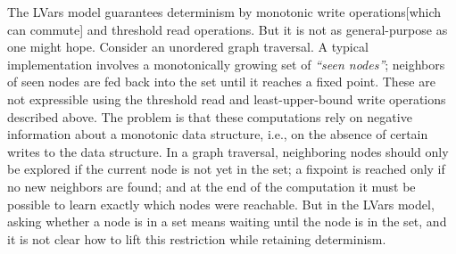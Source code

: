 \documentclass[twocolumn]{article}
\begin{document}
The LVars model guarantees determinism by monotonic write operations[which can commute] and threshold read operations. But it is not as general-purpose as one might hope. Consider an unordered graph traversal. A typical implementation involves a monotonically growing set of \emph{“seen nodes”}; neighbors of seen nodes are fed back into the set until it reaches a fixed point. These are not expressible using the threshold read and least-upper-bound write operations described above. The problem is that these computations rely on negative information about a monotonic data structure, i.e., on the absence of certain writes to the data structure. In a graph traversal, neighboring nodes should only be explored if the current node is not yet in the set; a fixpoint is reached only if no new neighbors are found; and at the end of the computation it must be possible to learn exactly which nodes were reachable. But in the LVars model, asking whether a node is in a set means waiting until the node is in the set, and it is not clear how to lift this restriction while retaining determinism.
\end{document}
